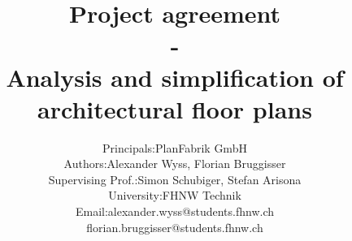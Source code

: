 \documentclass[11pt, a4paper]{report}
\begin{document}
	\title{\textbf{Project agreement \\ - \\Analysis and simplification of architectural floor plans}}
	\author{
			\begin{tabular}{l  l}
				Principals: & PlanFabrik GmbH \\
				Authors: & Alexander Wyss, Florian Bruggisser \\
				Supervising Prof.: & Simon Schubiger, Stefan Arisona \\ University: & FHNW Technik \\
				Email: & alexander.wyss@students.fhnw.ch \\ & florian.bruggisser@students.fhnw.ch				
			\end{tabular}
	}
	
	\maketitle
	\tableofcontents
	
	
	
	
	
	
	
	
\end{document}
